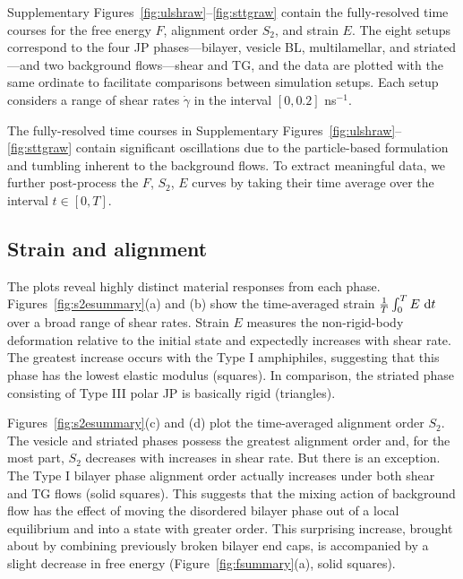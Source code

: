 \documentclass[prb,preprint,showpacs,preprintnumbers,amsmath,amssymb,longbibliography]{revtex4-2}
\begin{document}
Supplementary Figures~\ref{fig:ulshraw}--\ref{fig:sttgraw} contain the
fully-resolved time courses for the free energy $F$, alignment order
$S_2$, and strain $E$. The eight setups correspond to the four JP
phases---bilayer, vesicle BL, multilamellar, and striated---and two
background flows---shear and TG, and the data are plotted with the same
ordinate to facilitate comparisons between simulation setups. Each setup
considers a range of shear rates $\dot \gamma$ in the interval $[0,
0.2]$ ns$^{-1}$.

The fully-resolved time courses in Supplementary
Figures~\ref{fig:ulshraw}--\ref{fig:sttgraw} contain significant
oscillations due to the particle-based formulation and tumbling inherent
to the background flows. To extract meaningful data, we further
post-process the $F$, $S_2$, $E$ curves by taking their time average
over the interval $t \in [0, T]$. 

\subsection{Strain and alignment}
\label{sec:strain-alignment}
The plots reveal highly distinct material responses from each phase.
Figures~\ref{fig:s2esummary}(a) and (b) show the time-averaged strain
$\frac{1}{T}\int_0^T E \,\dif t$ over a broad range of shear rates.
Strain $E$ measures the non-rigid-body deformation relative to the
initial state and expectedly increases with shear rate. The greatest
increase occurs with the Type I amphiphiles, suggesting that this phase
has the lowest elastic modulus (squares). In comparison, the striated
phase consisting of Type III polar JP is basically rigid (triangles).

Figures~\ref{fig:s2esummary}(c) and (d) plot the time-averaged alignment
order $S_2$. The vesicle and striated phases possess the greatest
alignment order and, for the most part, $S_2$ decreases with increases
in shear rate. But there is an exception. The Type I bilayer phase
alignment order actually increases under both shear and TG flows (solid
squares). This suggests that the mixing action of background flow has
the effect of moving the disordered bilayer phase out of a local
equilibrium and into a state with greater order. This surprising
increase, brought about by combining previously broken bilayer end caps,
is accompanied by a slight decrease in free energy
(Figure~\ref{fig:fsummary}(a), solid squares).
\end{document}
